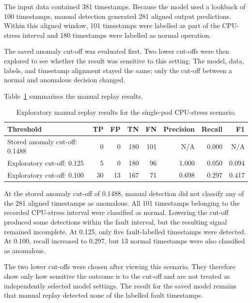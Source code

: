 The input data contained 381 timestamps. Because the model used a lookback of 100 timestamps, manual detection generated 281 aligned output predictions. Within this aligned window, 101 timestamps were labelled as part of the CPU-stress interval and 180 timestamps were labelled as normal operation.

The saved anomaly cut-off was evaluated first. Two lower cut-offs were then explored to see whether the result was sensitive to this setting. The model, data, labels, and timestamp alignment stayed the same; only the cut-off between a normal and anomalous decision changed.

Table~\ref{tab:paymentservice-cpu-manual} summarises the manual replay results.

\begin{table}[htbp]
    \centering
    \small
    \caption{Exploratory manual replay results for the single-pod CPU-stress scenario.}
    \label{tab:paymentservice-cpu-manual}
    \begin{tabular}{l r r r r r r r}
        \toprule
        \textbf{Threshold} & \textbf{TP} & \textbf{FP} & \textbf{TN} & \textbf{FN} & \textbf{Precision} & \textbf{Recall} & \textbf{F1} \\
        \midrule
        Stored anomaly cut-off: 0.1488
        & 0 & 0 & 180 & 101 & N/A & 0.000 & N/A \\
        Exploratory cut-off: 0.125
        & 5 & 0 & 180 & 96 & 1.000 & 0.050 & 0.094 \\
        Exploratory cut-off: 0.100
        & 30 & 13 & 167 & 71 & 0.698 & 0.297 & 0.417 \\
        \bottomrule
    \end{tabular}
\end{table}

At the stored anomaly cut-off of 0.1488, manual detection did not classify any of the 281 aligned timestamps as anomalous. All 101 timestamps belonging to the recorded CPU-stress interval were classified as normal. Lowering the cut-off produced some detections within the fault interval, but the resulting signal remained incomplete. At 0.125, only five fault-labelled timestamps were detected. At 0.100, recall increased to 0.297, but 13 normal timestamps were also classified as anomalous.

The two lower cut-offs were chosen after viewing this scenario. They therefore show only how sensitive the outcome is to the cut-off and are not treated as independently selected model settings. The result for the saved model remains that manual replay detected none of the labelled fault timestamps.

